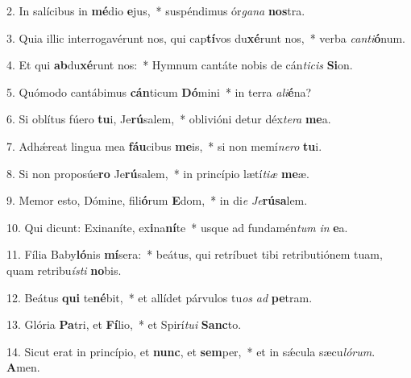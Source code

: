 2. In salícibus in \textbf{mé}dio \textbf{e}jus,~*  suspéndimus ór\textit{ga}\textit{na} \textbf{nos}tra.\

3. Quia illic interrogavérunt nos, qui cap\textbf{tí}vos du\textbf{xé}runt nos,~*  verba \textit{can}\textit{ti}\textbf{ó}num.\

4. Et qui \textbf{ab}du\textbf{xé}runt nos:~*  Hymnum cantáte nobis de cán\textit{ti}\textit{cis} \textbf{Si}on.\

5. Quómodo cantábimus \textbf{cán}ticum \textbf{Dó}mini~*  in terra \textit{a}\textit{li}\textbf{é}na?\

6. Si oblítus fúero \textbf{tu}i, Je\textbf{rú}salem,~*  oblivióni detur déx\textit{te}\textit{ra} \textbf{me}a.\

7. Adhǽreat lingua mea \textbf{fáu}cibus \textbf{me}is,~*  si non memí\textit{ne}\textit{ro} \textbf{tu}i.\

8. Si non proposúe\textbf{ro} Je\textbf{rú}salem,~*  in princípio lætí\textit{ti}\textit{æ} \textbf{me}æ.\

9. Memor esto, Dómine, fili\textbf{ó}rum \textbf{E}dom,~*  in di\textit{e} \textit{Je}\textbf{rú}\textbf{sa}lem.\

10. Qui dicunt: Exinaníte, ex\textbf{i}na\textbf{ní}te~*  usque ad fundamén\textit{tum} \textit{in} \textbf{e}a.\

11. Fília Baby\textbf{ló}nis \textbf{mí}sera:~*  beátus, qui retríbuet tibi retributiónem tuam, quam retribu\textit{ís}\textit{ti} \textbf{no}bis.\

12. Beátus \textbf{qui} te\textbf{né}bit,~*  et allídet párvulos tu\textit{os} \textit{ad} \textbf{pe}tram.\

13. Glória \textbf{Pa}tri, et \textbf{Fí}lio,~*  et Spirí\textit{tu}\textit{i} \textbf{Sanc}to.\

14. Sicut erat in princípio, et \textbf{nunc}, et \textbf{sem}per,~*  et in sǽcula sæcu\textit{ló}\textit{rum}. \textbf{A}men.\

